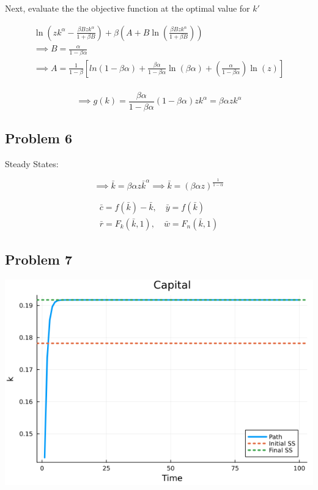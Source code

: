 \documentclass[12pt]{article}
\begin{document}
Next, evaluate the the objective function at the optimal value for $k'$

\begin{gather*}
    \ln(zk^\alpha - \frac{\beta B z k^\alpha}{1 + \beta B} ) + \beta(A + B \ln (\frac{\beta B z k^\alpha}{1 + \beta B})) \\
    \implies B = \frac{\alpha}{1 - \beta \alpha} \\
    \implies A = \frac{1}{1 - \beta}[ln(1-\beta \alpha) + \frac{\beta \alpha}{1 - \beta \alpha} \ln(\beta \alpha) + (\frac{\alpha}{1 - \beta \alpha})\ln(z)] \\
\end{gather*}

\begin{equation*}
    \implies g(k) = \frac{\beta \alpha}{1 - \beta \alpha} (1 - \beta \alpha) z k^\alpha = \beta \alpha z k^\alpha
\end{equation*}

\subsection*{Problem 6}

Steady States: 

\begin{equation*}
    \implies \bar{k} = \beta \alpha z \bar{k}^\alpha \implies \bar{k} = (\beta \alpha z)^{\frac{1}{1-\alpha}}
\end{equation*}

\begin{gather*}
    \bar{c} = f(\bar{k}) - \bar{k}, \quad \bar{y} = f(\bar{k}) \\
    \bar{r} = F_k(\bar{k}, 1), \quad \bar{w} = F_n(\bar{k}, 1)
\end{gather*}

\subsection*{Problem 7}

\begin{center}
    \includegraphics*[scale = 0.5]{fig1.png}
\end{center}
\end{document}
